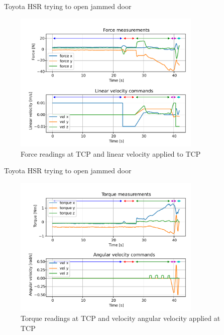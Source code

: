 \documentclass[aspectratio=43,10pt,fleqn,t]{beamer}
\begin{document}
\begin{frame}{~}{\small Toyota HSR trying to open jammed door}
	\vspace{-1cm}
	\begin{figure}[h]
		\centering
		\includegraphics[width=0.8\textwidth]{images/exp/8776_fn.pdf}
		\caption{Force readings at TCP and linear velocity applied to TCP}
	\end{figure}
\end{frame}


\begin{frame}{~}{\small Toyota HSR trying to open jammed door}
	\vspace{-1cm}
	\begin{figure}[t]
		\centering
		\includegraphics[width=0.8\textwidth]{images/exp/8776n.pdf}
		\caption{Torque readings at TCP and velocity angular velocity applied at TCP}

	\end{figure}
\end{frame}
\end{document}
